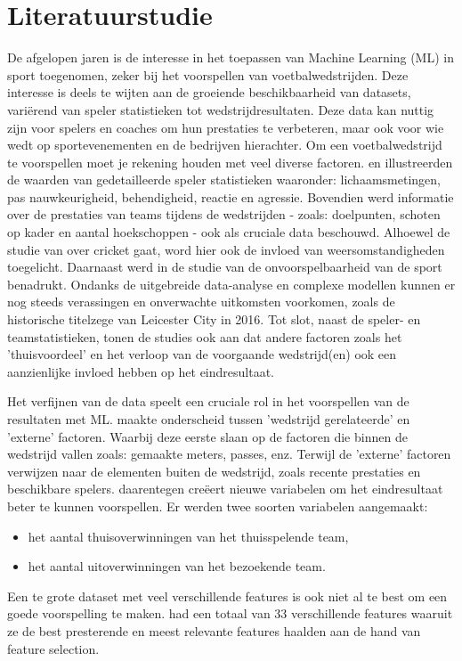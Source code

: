 
\section{Literatuurstudie}%
\label{sec:state-of-the-art}

De afgelopen jaren is de interesse in het toepassen van Machine Learning (ML) in sport toegenomen, zeker bij het voorspellen van voetbalwedstrijden. Deze interesse is deels te wijten aan de groeiende beschikbaarheid van datasets, variërend van speler statistieken tot wedstrijdresultaten. Deze data kan nuttig zijn voor spelers en coaches om hun prestaties te verbeteren, maar ook voor wie wedt op sportevenementen en de bedrijven hierachter.
Om een voetbalwedstrijd te voorspellen moet je rekening houden met veel diverse factoren. \textcite{Stuebinger2020} en \textcite{Rodrigues2022} illustreerden de waarden van gedetailleerde speler statistieken waaronder: lichaamsmetingen, pas nauwkeurigheid, behendigheid, reactie en agressie. Bovendien werd informatie over de prestaties van teams tijdens de wedstrijden - zoals: doelpunten, schoten op kader en aantal hoekschoppen - ook als cruciale data beschouwd. Alhoewel de studie van \textcite{Sathyanarayana2022} over cricket gaat, word hier ook de invloed van weersomstandigheden toegelicht.
Daarnaast werd in de studie van \textcite{Baboota2019} de onvoorspelbaarheid van de sport benadrukt. Ondanks de uitgebreide data-analyse en complexe modellen kunnen er nog steeds verassingen en onverwachte uitkomsten voorkomen, zoals de historische titelzege van Leicester City in 2016.
Tot slot, naast de speler- en teamstatistieken, tonen de studies ook aan dat andere factoren zoals het 'thuisvoordeel' en het verloop van de voorgaande wedstrijd(en) ook een aanzienlijke invloed hebben op het eindresultaat.

Het verfijnen van de data speelt een cruciale rol in het voorspellen van de resultaten met ML. \textcite{Bunker2019} maakte onderscheid tussen 'wedstrijd gerelateerde' en 'externe' factoren. Waarbij deze eerste slaan op de factoren die binnen de wedstrijd vallen zoals: gemaakte meters, passes, enz. Terwijl de 'externe' factoren verwijzen naar de elementen buiten de wedstrijd, zoals recente prestaties en beschikbare spelers.
\textcite{Rodrigues2022} daarentegen creëert nieuwe variabelen om het eindresultaat beter te kunnen voorspellen. Er werden twee soorten variabelen aangemaakt:
\begin{itemize}
  \item het aantal thuisoverwinningen van het thuisspelende team,
  \item het aantal uitoverwinningen van het bezoekende team.
\end{itemize}
Een te grote dataset met veel verschillende features is ook niet al te best om een goede voorspelling te maken. \textcite{Baboota2019} had een totaal van 33 verschillende features waaruit ze de best presterende en meest relevante features haalden aan de hand van feature selection.

